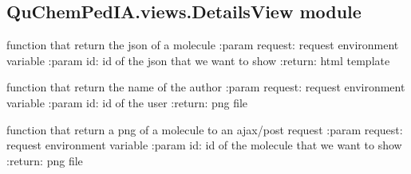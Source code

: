 \documentclass[letterpaper,10pt,english]{sphinxmanual}
\begin{document}
\subsection{QuChemPedIA.views.DetailsView module}
\label{\detokenize{QuChemPedIA.views:module-QuChemPedIA.views.DetailsView}}\label{\detokenize{QuChemPedIA.views:quchempedia-views-detailsview-module}}

\begin{fulllineitems}
\label{\detokenize{QuChemPedIA.views:QuChemPedIA.views.DetailsView.details}}
function that return the json of a molecule
:param request: request environment variable
:param id: id of the json that we want to show
:return: html template

\end{fulllineitems}


\begin{fulllineitems}
\label{\detokenize{QuChemPedIA.views:QuChemPedIA.views.DetailsView.details_author}}
function that return the name of the author
:param request: request environment variable
:param id: id of the user
:return: png file

\end{fulllineitems}


\begin{fulllineitems}
\label{\detokenize{QuChemPedIA.views:QuChemPedIA.views.DetailsView.details_image}}
function that return a png of a molecule to an ajax/post request
:param request: request environment variable
:param id: id of the molecule that we want to show
:return: png file

\end{fulllineitems}

\end{document}
